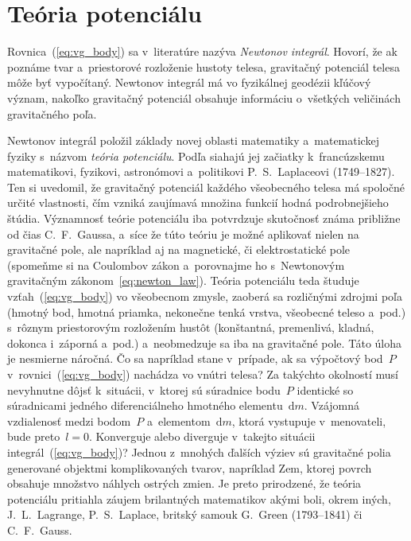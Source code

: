 \documentclass[a4paper,12pt]{book}
\newcommand{\diff}{\mathrm d}
\begin{document}
\section{Teória potenciálu}
\label{sec:potential_theory}

Rovnica~(\ref{eq:vg_body}) sa v~literatúre nazýva \emph{Newtonov
integrál}.  Hovorí, že ak poznáme tvar a~priestorové rozloženie hustoty telesa,
gravitačný potenciál telesa môže byť vypočítaný.  Newtonov
integrál má vo fyzikálnej geodézii kľúčový význam, nakoľko gravitačný potenciál 
obsahuje informáciu o~všetkých veličinách gravitačného poľa.

Newtonov integrál položil základy novej oblasti matematiky a~matematickej 
fyziky s~názvom \emph{teória potenciálu}.  Podľa \textcite{MacMillan1930} 
siahajú jej začiatky k~francúzskemu matematikovi, fyzikovi, astronómovi 
a~politikovi P.~S.~Laplaceovi (1749--1827).  Ten si uvedomil, že gravitačný 
potenciál každého všeobecného telesa má spoločné určité vlastnosti, čím vzniká 
zaujímavá množina funkcií hodná podrobnejšieho štúdia.  Významnosť teórie 
potenciálu iba potvrdzuje skutočnosť známa približne od čias C.~F.~Gaussa, 
a~síce že túto teóriu je možné aplikovať nielen na gravitačné pole, ale 
napríklad aj na magnetické, či elektrostatické pole (spomeňme si na Coulombov 
zákon a~porovnajme ho s~Newtonovým gravitačným zákonom~\ref{eq:newton_law}).  
Teória potenciálu teda študuje vzťah~(\ref{eq:vg_body}) vo všeobecnom zmysle, 
zaoberá sa rozličnými zdrojmi poľa (hmotný bod, hmotná priamka, nekonečne tenká 
vrstva, všeobecné teleso a~pod.) s~rôznym priestorovým rozložením hustôt 
(konštantná, premenlivá, kladná, dokonca i~záporná a~pod.) a~neobmedzuje sa iba 
na gravitačné pole.  Táto úloha je nesmierne náročná.  Čo sa napríklad stane 
v~prípade, ak sa výpočtový bod~$P$ v~rovnici~(\ref{eq:vg_body}) nachádza vo 
vnútri telesa?  Za takýchto okolností musí nevyhnutne dôjsť k~situácii, 
v~ktorej sú súradnice bodu~$P$ identické so súradnicami jedného diferenciálneho 
hmotného elementu~$\diff m$.  Vzájomná vzdialenosť medzi bodom~$P$ 
a~elementom~$\diff m$, ktorá vystupuje v~menovateli, bude preto~$l = 0$.  
Konverguje alebo diverguje v~takejto situácii integrál~(\ref{eq:vg_body})?  
Jednou z~mnohých ďalších výziev sú gravitačné polia generované objektmi 
komplikovaných tvarov, napríklad Zem, ktorej povrch obsahuje množstvo náhlych 
ostrých zmien.  Je preto prirodzené, že teória potenciálu pritiahla záujem 
brilantných matematikov akými boli, okrem iných, J.~L.~Lagrange, P.~S.~Laplace, 
britský samouk G.~Green (1793--1841) či C.~F.~Gauss.
\end{document}
